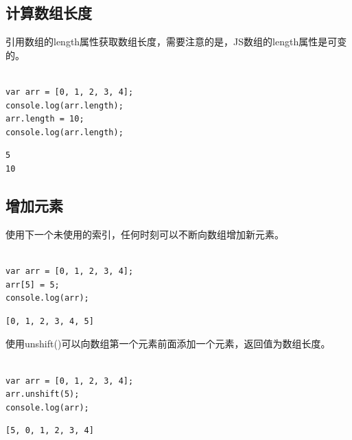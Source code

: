\subsection{计算数组长度}

引用数组的length属性获取数组长度，需要注意的是，JS数组的length属性是可变的。 \\

 \\

\begin{lstlisting}[style=htmlcssjs]
var arr = [0, 1, 2, 3, 4];
console.log(arr.length);
arr.length = 10;
console.log(arr.length);
\end{lstlisting}

\begin{tcolorbox}
	\begin{verbatim}
5
10
	\end{verbatim}
\end{tcolorbox}

\subsection{增加元素}

使用下一个未使用的索引，任何时刻可以不断向数组增加新元素。 \\

 \\

\begin{lstlisting}[style=htmlcssjs]
var arr = [0, 1, 2, 3, 4];
arr[5] = 5;
console.log(arr);
\end{lstlisting}

\begin{tcolorbox}
	\begin{verbatim}
[0, 1, 2, 3, 4, 5]
	\end{verbatim}
\end{tcolorbox}

使用unshift()可以向数组第一个元素前面添加一个元素，返回值为数组长度。 \\

 \\

\begin{lstlisting}[style=htmlcssjs]
var arr = [0, 1, 2, 3, 4];
arr.unshift(5);
console.log(arr);
\end{lstlisting}

\begin{tcolorbox}
	\begin{verbatim}
[5, 0, 1, 2, 3, 4]
	\end{verbatim}
\end{tcolorbox}


